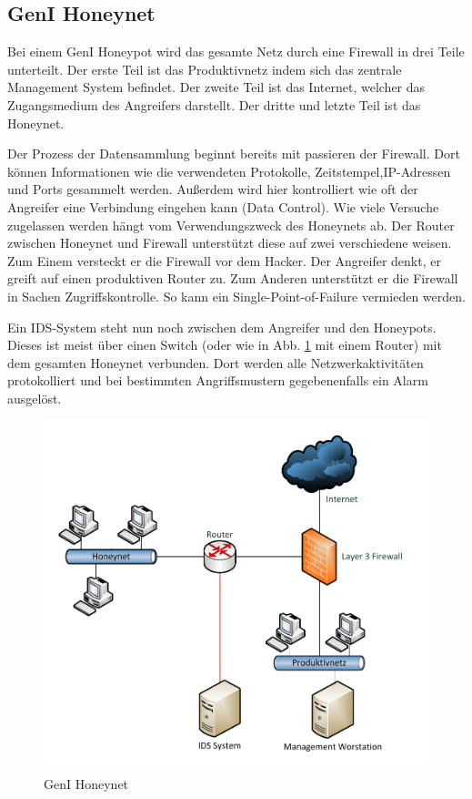 \subsection{GenI Honeynet}
Bei einem GenI Honeypot wird das gesamte Netz durch eine Firewall in drei Teile unterteilt. Der erste Teil ist das Produktivnetz indem sich das zentrale Management System befindet. Der zweite Teil ist das Internet, welcher das Zugangsmedium des Angreifers darstellt. Der dritte und letzte Teil ist das Honeynet. 

Der Prozess der Datensammlung beginnt bereits mit passieren der Firewall. Dort können Informationen wie die verwendeten Protokolle, Zeitstempel,IP-Adressen und Ports gesammelt werden. Außerdem wird hier kontrolliert wie oft der Angreifer eine Verbindung eingehen kann (Data Control). Wie viele Versuche zugelassen werden hängt vom Verwendungszweck des Honeynets ab. Der Router zwischen Honeynet und Firewall unterstützt diese auf zwei verschiedene weisen. Zum Einem versteckt er die Firewall vor dem Hacker. Der Angreifer denkt, er greift auf einen produktiven Router zu. Zum Anderen unterstützt er die Firewall in Sachen Zugriffskontrolle. So kann ein Single-Point-of-Failure vermieden werden. 

Ein IDS-System steht nun noch zwischen dem Angreifer und den Honeypots. Dieses ist meist über einen Switch (oder wie in Abb. \ref{hnet:geni} mit einem Router) mit dem gesamten Honeynet verbunden. Dort werden alle Netzwerkaktivitäten protokolliert und bei bestimmten Angriffsmustern gegebenenfalls ein Alarm ausgelöst. 
\\
\begin{figure}[ht]
    \centering\includegraphics[scale=0.5]{Bilder/GenI.pdf}
  \caption{GenI Honeynet}
  \label{hnet:geni}
\end{figure}
\\